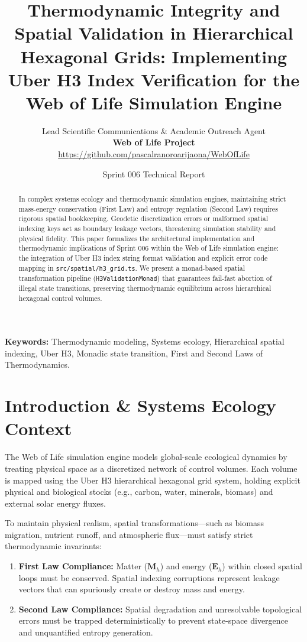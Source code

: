 \documentclass[11pt, a4paper]{article}
\title{\textbf{Thermodynamic Integrity and Spatial Validation in Hierarchical Hexagonal Grids: Implementing Uber H3 Index Verification for the Web of Life Simulation Engine}}
\author{Lead Scientific Communications \& Academic Outreach Agent \\ \textbf{Web of Life Project} \\ \url{https://github.com/pascalranoroarijaona/WebOfLife}}
\date{Sprint 006 Technical Report}
\begin{document}
\maketitle

\begin{abstract}
In complex systems ecology and thermodynamic simulation engines, maintaining strict mass-energy conservation (First Law) and entropy regulation (Second Law) requires rigorous spatial bookkeeping. Geodetic discretization errors or malformed spatial indexing keys act as boundary leakage vectors, threatening simulation stability and physical fidelity. This paper formalizes the architectural implementation and thermodynamic implications of Sprint 006 within the Web of Life simulation engine: the integration of Uber H3 index string format validation and explicit error code mapping in \texttt{src/spatial/h3\_grid.ts}. We present a monad-based spatial transformation pipeline (\texttt{H3ValidationMonad}) that guarantees fail-fast abortion of illegal state transitions, preserving thermodynamic equilibrium across hierarchical hexagonal control volumes.
\end{abstract}

\noindent\textbf{Keywords:} Thermodynamic modeling, Systems ecology, Hierarchical spatial indexing, Uber H3, Monadic state transition, First and Second Laws of Thermodynamics.

\section{Introduction \& Systems Ecology Context}
The Web of Life simulation engine models global-scale ecological dynamics by treating physical space as a discretized network of control volumes. Each volume is mapped using the Uber H3 hierarchical hexagonal grid system, holding explicit physical and biological stocks (e.g., carbon, water, minerals, biomass) and external solar energy fluxes. 

To maintain physical realism, spatial transformations---such as biomass migration, nutrient runoff, and atmospheric flux---must satisfy strict thermodynamic invariants:
\begin{enumerate}
    \item \textbf{First Law Compliance:} Matter ($\mathbf{M}_h$) and energy ($\mathbf{E}_h$) within closed spatial loops must be conserved. Spatial indexing corruptions represent leakage vectors that can spuriously create or destroy mass and energy.
    \item \textbf{Second Law Compliance:} Spatial degradation and unresolvable topological errors must be trapped deterministically to prevent state-space divergence and unquantified entropy generation.
\end{enumerate}
\end{document}
